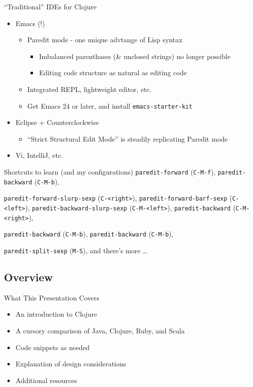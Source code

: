 \documentclass{beamer}
\begin{document}
\begin{frame}[allowframebreaks]{``Traditional'' IDEs for Clojure}
  \begin{itemize}
  \item Emacs (!)
    \begin{itemize}
    \item Paredit mode - one unique advtange of Lisp syntax
      \begin{itemize}
      \item Imbalanced parenthases (\& unclosed strings) no longer possible
      \item Editing code structure as natural as editing code
      \end{itemize}
    \item Integrated REPL, lightweight editor, etc.
    \item Get Emacs 24 or later, and install \texttt{emacs-starter-kit}
    \end{itemize}
  \item Eclipse + Counterclockwise
    \begin{itemize}
    \item ``Strict Structural Edit Mode'' is steadily replicating Paredit mode
    \end{itemize}
  \item Vi, IntelliJ, etc.
  \end{itemize}


\begin{block}{Shortcuts to learn (and my configurations)}
\texttt{paredit-forward} (\texttt{C-M-f}),
\texttt{paredit-backward} (\texttt{C-M-b}),

\texttt{paredit-forward-slurp-sexp} (\texttt{C-<right>}),
\texttt{paredit-forward-barf-sexp} (\texttt{C-<left>}),
\texttt{paredit-backward-slurp-sexp} (\texttt{C-M-<left>}),
\texttt{paredit-backward} (\texttt{C-M-<right>}),

\texttt{paredit-backward} (\texttt{C-M-b}),
\texttt{paredit-backward} (\texttt{C-M-b}),

\texttt{paredit-split-sexp} (\texttt{M-S}),
and there's more \ldots
\end{block}

\end{frame}

\subsection{Overview}

\begin{frame}{What This Presentation Covers}
	\begin{itemize}
	\item An introduction to Clojure
	\item A cursory comparison of Java, Clojure, Ruby, and Scala
	\item Code snippets as needed
	\item Explanation of design considerations
	\item Additional resources
	\end{itemize}
\end{frame}
\end{document}
